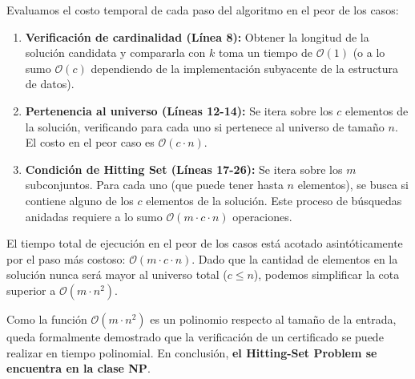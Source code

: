 Evaluamos el costo temporal de cada paso del algoritmo en el peor de los casos:
\begin{enumerate}
    \item \textbf{Verificación de cardinalidad (Línea 8):} Obtener la longitud de la solución candidata y compararla con $k$ toma un tiempo de $\mathcal{O}(1)$ (o a lo sumo $\mathcal{O}(c)$ dependiendo de la implementación subyacente de la estructura de datos).
    \item \textbf{Pertenencia al universo (Líneas 12-14):} Se itera sobre los $c$ elementos de la solución, verificando para cada uno si pertenece al universo de tamaño $n$. El costo en el peor caso es $\mathcal{O}(c \cdot n)$.
    \item \textbf{Condición de Hitting Set (Líneas 17-26):} Se itera sobre los $m$ subconjuntos. Para cada uno (que puede tener hasta $n$ elementos), se busca si contiene alguno de los $c$ elementos de la solución. Este proceso de búsquedas anidadas requiere a lo sumo $\mathcal{O}(m \cdot c \cdot n)$ operaciones.
\end{enumerate}

El tiempo total de ejecución en el peor de los casos está acotado asintóticamente por el paso más costoso: $\mathcal{O}(m \cdot c \cdot n)$. Dado que la cantidad de elementos en la solución nunca será mayor al universo total ($c \leq n$), podemos simplificar la cota superior a $\mathcal{O}(m \cdot n^2)$.

Como la función $\mathcal{O}(m \cdot n^2)$ es un polinomio respecto al tamaño de la entrada, queda formalmente demostrado que la verificación de un certificado se puede realizar en tiempo polinomial. En conclusión, \textbf{el Hitting-Set Problem se encuentra en la clase NP}.